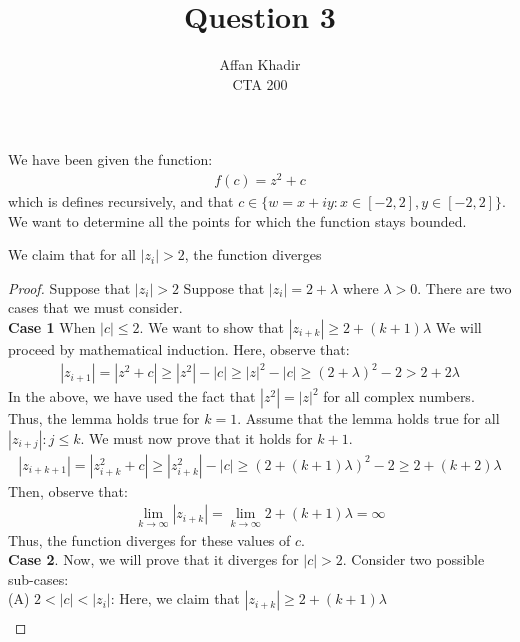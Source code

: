 \documentclass[12pt]{article}
\newenvironment{lemma}[2][Lemma]{\begin{trivlist}
\item[\hskip \labelsep {\bfseries #1}\hskip \labelsep {\bfseries #2.}]}{\end{trivlist}}
\newenvironment{question}[2][Question]{\begin{trivlist}
\item[\hskip \labelsep {\bfseries #1}\hskip \labelsep {\bfseries #2.}]}{\end{trivlist}}
\begin{document}
 

 
\title{Question 3}
\author{Affan Khadir\\ 
CTA 200}
\pagecolor{white}
\color{black}
 
\maketitle

\begin{question}1
We have been given the function: 
\begin{align*}
    f(c) = z^2 + c
\end{align*}
which is defines recursively, and that $c \in \{w = x+ iy: x \in [-2,2], y\in [-2, 2] \}$. We want to determine all the points for which the function stays bounded. 
\begin{lemma}1
    We claim that for all $|z_i|>2$, the function diverges
\end{lemma}
\begin{proof}
    Suppose that $|z_i|>2 $ Suppose that $|z_i| = 2 + \lambda$ where $\lambda>0 $. There are two cases that we must consider. \\
    \textbf{Case 1} When $|c|\leq 2$. We want to show that $|z_{i+k}| \geq 2 + (k+1)\lambda $ We will proceed by mathematical induction. Here, observe that: 
    \begin{align*}
        |z_{i+1}| = |z^2 + c| \geq |z^2| - |c| \geq |z|^2 - |c|\geq (2+\lambda)^2 - 2 > 2 + 2\lambda 
    \end{align*}
    In the above, we have used the fact that $|z^2|= |z|^2 $ for all complex numbers. Thus, the lemma holds true for $k=1$. 
    Assume that the lemma holds true for all $|z_{i+j}|: j\leq k$. We must now prove that it holds for $k + 1$. 
    \begin{align*}
        |z_{i+k+1}|  = |z_{i+k}^2 +c | \geq |z^2_{i+k}| -|c| \geq (2+(k+1)\lambda)^2 - 2 \geq 2 + (k+2) \lambda 
    \end{align*}
    Then, observe that: 
    \begin{align*}
        \lim_{k\to \infty} |z_{i+k}|= \lim_{k\to \infty } 2 + (k+1) \lambda =\infty
    \end{align*}
    Thus, the function diverges for these values of $c$. \\
    \textbf{Case 2}. Now, we will prove that it diverges for $|c|> 2$. Consider two possible sub-cases:\\
    (A) $2< |c| < |z_i| $: Here, we claim that $|z_{i+k}| \geq 2+ (k+1) \lambda $
    \begin{align*}

\end{align*}
\end{proof}
\end{question}
\end{document}
